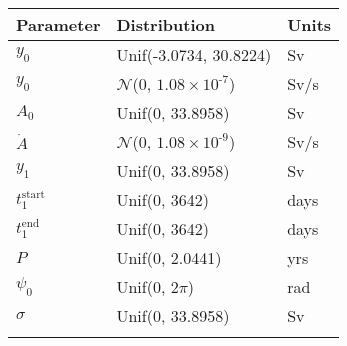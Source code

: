 \begin{tabular}{lll} \hhline{===}
        Parameter & Distribution &  Units\\ \hline
$y_0$ & Unif(\textrm{-}3.0734, 30.8224) & Sv\\
$y_0$ & $\mathcal{N}$(0, ${1.08}\times 10^{\textrm{-}7}$) & Sv/s\\
$A_0$ & Unif(0, 33.8958) & Sv\\
$\dot{A}$ & $\mathcal{N}$(0, ${1.08}\times 10^{\textrm{-}9}$) & Sv/s\\
$y_1$
 & Unif(0, 33.8958) & Sv\\
$t_1^\mathrm{start}$
 & Unif(0, 3642) & days\\
$t_1^\mathrm{end}$
 & Unif(0, 3642) & days\\
$P$ & Unif(0, 2.0441) & yrs\\
$\psi_0$ & Unif(0, $2\pi$) & rad\\
$\sigma$ & Unif(0, 33.8958) & Sv\\
\hhline{===}
\end{tabular}